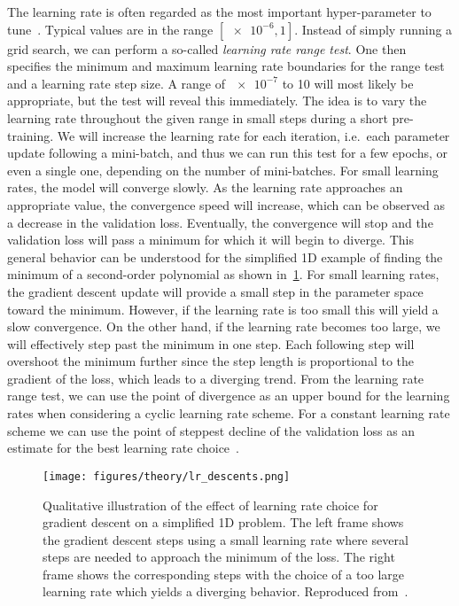 The learning rate is often regarded as the most important hyper-parameter to
tune~\cite{Bengio2012}. Typical values are in the range $[\num{e-6}, 1]$.
Instead of simply running a grid search, we can perform a so-called
\textit{learning rate range test}. One then specifies the
minimum and maximum learning rate boundaries for the range test and a learning rate step size. A range of $\num{e-7}$ to 10 will most likely be appropriate, but the test will reveal this immediately. The idea is to
vary the learning rate throughout the given range in small steps during a short
pre-training. We will increase the learning rate for each iteration, i.e.\ each
parameter update following a mini-batch, and thus we can run this test for a few
epochs, or even a single one, depending on the number of mini-batches. For small
learning rates, the model will converge slowly. As the learning rate approaches
an appropriate value, the convergence speed will increase, which can be observed
as a decrease in the validation loss. Eventually, the convergence will stop and
the validation loss will pass a minimum for which it will begin to diverge. This
general behavior can be understood for the simplified 1D example of finding the
minimum of a second-order polynomial as shown in~\cref{fig:lr_descents}. For
small learning rates, the gradient descent update will provide a small step in
the parameter space toward the minimum. However, if the learning rate is too
small this will yield a slow convergence. On the other hand, if the learning
rate becomes too large, we will effectively step past the minimum in one step.
Each following step will overshoot the minimum further since the step
length is proportional to the gradient of the loss, which leads to a diverging
trend. From the learning rate range test, we can use the point of divergence as an upper bound for the learning rates when considering a cyclic learning rate scheme. For a constant learning rate scheme we can use the point of steppest decline of the validation loss as an estimate for the best learning rate choice~\cite{smith2018disciplined}.


\begin{figure}[!htb]
  \centering
  \texttt{[image: figures/theory/lr\_descents.png]}
  \caption{Qualitative illustration of the effect of learning rate choice for gradient descent on a simplified 1D problem. The left frame shows the gradient descent steps using a small learning rate where several steps are needed to approach the minimum of the loss. The right frame shows the corresponding steps with the choice of a too large learning rate which yields a diverging behavior. Reproduced from~\cite{JavaTpoint}.}
  \label{fig:lr_descents}
\end{figure}


